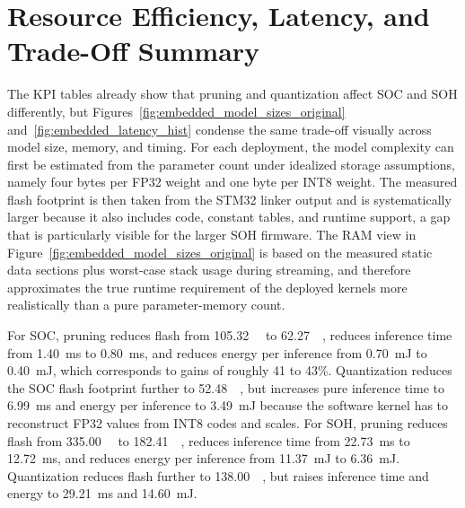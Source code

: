 \documentclass[
    a4paper,
    12pt,
    titlepage,
    bibliography=totoc,
    twoside=on,
    parskip=false,
    numbers=noenddot,
    cleardoublepage=empty,
    DIV=12,
    BCOR=12.0mm,
    headheight=36pt,
    headings=openright
]{scrreprt}
\begin{document}
\section{Resource Efficiency, Latency, and Trade-Off Summary}
The KPI tables already show that pruning and quantization affect SOC and SOH differently, but Figures~\ref{fig:embedded_model_sizes_original} and~\ref{fig:embedded_latency_hist} condense the same trade-off visually across model size, memory, and timing. For each deployment, the model complexity can first be estimated from the parameter count under idealized storage assumptions, namely four bytes per FP32 weight and one byte per INT8 weight. The measured flash footprint is then taken from the STM32 linker output and is systematically larger because it also includes code, constant tables, and runtime support, a gap that is particularly visible for the larger SOH firmware. The RAM view in Figure~\ref{fig:embedded_model_sizes_original} is based on the measured static data sections plus worst-case stack usage during streaming, and therefore approximates the true runtime requirement of the deployed kernels more realistically than a pure parameter-memory count.

For SOC, pruning reduces flash from \SI{105.32}{\kilo\byte} to \SI{62.27}{\kilo\byte}, reduces inference time from \SI{1.40}{\milli\second} to \SI{0.80}{\milli\second}, and reduces energy per inference from \SI{0.70}{\milli\joule} to \SI{0.40}{\milli\joule}, which corresponds to gains of roughly 41 to 43\%. Quantization reduces the SOC flash footprint further to \SI{52.48}{\kilo\byte}, but increases pure inference time to \SI{6.99}{\milli\second} and energy per inference to \SI{3.49}{\milli\joule} because the software kernel has to reconstruct FP32 values from INT8 codes and scales. For SOH, pruning reduces flash from \SI{335.00}{\kilo\byte} to \SI{182.41}{\kilo\byte}, reduces inference time from \SI{22.73}{\milli\second} to \SI{12.72}{\milli\second}, and reduces energy per inference from \SI{11.37}{\milli\joule} to \SI{6.36}{\milli\joule}. Quantization reduces flash further to \SI{138.00}{\kilo\byte}, but raises inference time and energy to \SI{29.21}{\milli\second} and \SI{14.60}{\milli\joule}.
\end{document}
